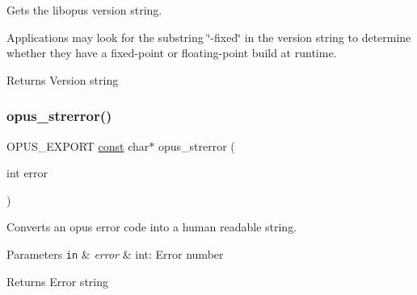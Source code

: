 Gets the libopus version string.

Applications may look for the substring \char`\"{}-\/fixed\char`\"{} in the version string to determine whether they have a fixed-\/point or floating-\/point build at runtime.

\begin{DoxyReturn}{Returns}
Version string 
\end{DoxyReturn}
\mbox{\label{group__opus__libinfo_ga4474c7a5797d39d8a3c3c14f64e9a30f}} 
\subsubsection{\texorpdfstring{opus\+\_\+strerror()}{opus\_strerror()}}
{\footnotesize\ttfamily O\+P\+U\+S\+\_\+\+E\+X\+P\+O\+RT \hyperlink{zconf_8h_a2c212835823e3c54a8ab6d95c652660e}{const} char$\ast$ opus\+\_\+strerror (\begin{DoxyParamCaption}\item[{int}]{error }\end{DoxyParamCaption})}

Converts an opus error code into a human readable string.


\begin{DoxyParams}[1]{Parameters}
\mbox{\tt in}  & {\em error} & {\ttfamily int}\+: Error number \\
\hline
\end{DoxyParams}
\begin{DoxyReturn}{Returns}
Error string 
\end{DoxyReturn}
